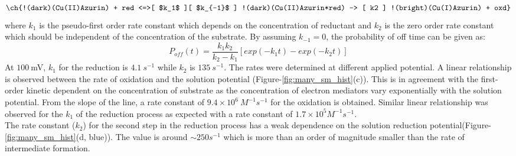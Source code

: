 \documentclass[journal=jacsat,manuscript=article]{achemso}
\begin{document}
\begin{align}
	\ch{!(dark)(Cu(II)Azurin) + red <=>[ $k_1$ ][ $k_{-1}$ ] !(dark)(Cu(II)Azurin*red) -> [ k2 ] !(bright)(Cu(I)Azurin) + oxd}
	\label{eq:reduction}
\end{align}
where $k_1$ is the pseudo-first order rate constant which depends on the concentration of reductant and $k_2$ is the zero order rate constant which should be independent of the concentration of the substrate. By assuming $k_{-1}=0$, the probability of off time can be given as:\cite{lu1998single-molecule}
\begin{equation}
	P_{off}(t) = \frac{k_1k_2}{k_2-k_1} [exp(-k_1t)-exp(-k_2t)]
	\label{eq:2exp_risetime}
\end{equation}
At $100~$mV, $k_1$ for the reduction is $4.1~s^{-1}$ while $k_2$ is $135~s^{-1}$. The rates were determined at different applied potential. A linear relationship is observed between the rate of oxidation and the solution potential (Figure-\ref{fig:many_sm_hist}(c)). This is in agreement with the first-order kinetic dependent on the concentration of substrate as the concentration of electron mediators vary exponentially with the solution potential. From the slope of the line, a rate constant of $9.4\times10^6~M^{-1}s^{-1}$ for the oxidation is obtained. Similar linear relationship was observed for the $k_1$ of the reduction process as expected with a rate constant of $1.7\times10^5M^{-1}s^{-1}$.\\
The rate constant ($k_2$) for the second step in the reduction process has a weak dependence on the solution reduction potential(Figure-\ref{fig:many_sm_hist}(d, blue)). The value is around ${\sim}250s^{-1}$ which is more than an order of magnitude smaller than the rate of intermediate formation.\\
\end{document}
